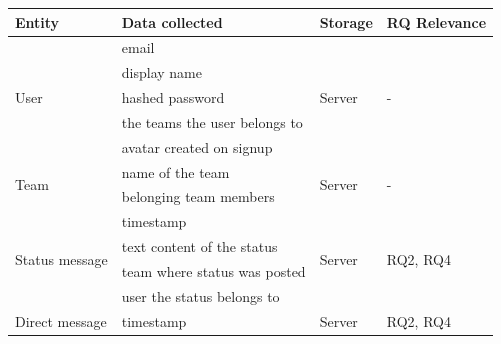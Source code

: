\begin{table}[h] \footnotesize
    \centering
    \begin{tabularx}{.9\textwidth}{l X l l}
        \toprule
        Entity                               & Data collected                         & Storage                 & RQ Relevance                  \\
        \midrule
        \multirow{5}{*}{User}                & email                                  & \multirow{5}{*}{Server} & \multirow{5}{*}{-}            \\
                                             & display name                           &                         &                               \\
                                             & hashed password                        &                         &                               \\
                                             & the teams the user belongs to          &                         &                               \\
                                             & avatar created on signup               &                         &                               \\
        \midrule
        \multirow{2}{*}{Team}                & name of the team                       & \multirow{2}{*}{Server} & \multirow{2}{*}{-}            \\
                                             & belonging team members                 &                         &                               \\
        \midrule
        \multirow{4}{*}{Status message}      & timestamp                              & \multirow{4}{*}{Server} & \multirow{4}{*}{RQ2, RQ4    } \\
                                             & text content of the status             &                         &                               \\
                                             & team where status was posted           &                         &                               \\
                                             & user the status belongs to             &                         &                               \\
        \midrule
        \multirow{4}{*}{Direct message}      & timestamp                              & \multirow{4}{*}{Server} & \multirow{4}{*}{RQ2, RQ4    } \\

\end{tabularx}
\end{table}
